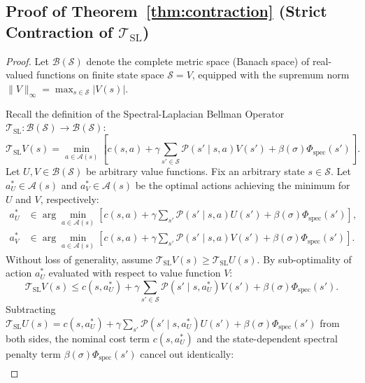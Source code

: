 \documentclass[11pt,a4paper]{article}
\begin{document}
\subsection{Proof of Theorem~\ref{thm:contraction} (Strict Contraction of $\mathcal{T}_{\text{SL}}$)}
\label{subsec:proof_thm2}

\begin{proof}
Let $\mathcal{B}(\mathcal{S})$ denote the complete metric space (Banach space) of real-valued functions on finite state space $\mathcal{S} = V$, equipped with the supremum norm $\|V\|_\infty = \max_{s \in \mathcal{S}} |V(s)|$.

Recall the definition of the Spectral-Laplacian Bellman Operator $\mathcal{T}_{\text{SL}}: \mathcal{B}(\mathcal{S}) \to \mathcal{B}(\mathcal{S})$:
\begin{equation}
\mathcal{T}_{\text{SL}} V(s) = \min_{a \in \mathcal{A}(s)} \left[ c(s, a) + \gamma \sum_{s' \in \mathcal{S}} \mathcal{P}(s' \mid s, a) V(s') + \beta(\sigma) \Phi_{\text{spec}}(s') \right].
\end{equation}
Let $U, V \in \mathcal{B}(\mathcal{S})$ be arbitrary value functions. Fix an arbitrary state $s \in \mathcal{S}$. Let $a_U^* \in \mathcal{A}(s)$ and $a_V^* \in \mathcal{A}(s)$ be the optimal actions achieving the minimum for $U$ and $V$, respectively:
\begin{align}
a_U^* &\in \arg\min_{a \in \mathcal{A}(s)} \left[ c(s, a) + \gamma \sum_{s'} \mathcal{P}(s' \mid s, a) U(s') + \beta(\sigma) \Phi_{\text{spec}}(s') \right], \\
a_V^* &\in \arg\min_{a \in \mathcal{A}(s)} \left[ c(s, a) + \gamma \sum_{s'} \mathcal{P}(s' \mid s, a) V(s') + \beta(\sigma) \Phi_{\text{spec}}(s') \right].
\end{align}
Without loss of generality, assume $\mathcal{T}_{\text{SL}} V(s) \ge \mathcal{T}_{\text{SL}} U(s)$. By sub-optimality of action $a_U^*$ evaluated with respect to value function $V$:
\begin{equation}
\mathcal{T}_{\text{SL}} V(s) \le c(s, a_U^*) + \gamma \sum_{s' \in \mathcal{S}} \mathcal{P}(s' \mid s, a_U^*) V(s') + \beta(\sigma) \Phi_{\text{spec}}(s').
\end{equation}
Subtracting $\mathcal{T}_{\text{SL}} U(s) = c(s, a_U^*) + \gamma \sum_{s'} \mathcal{P}(s' \mid s, a_U^*) U(s') + \beta(\sigma) \Phi_{\text{spec}}(s')$ from both sides, the nominal cost term $c(s, a_U^*)$ and the state-dependent spectral penalty term $\beta(\sigma) \Phi_{\text{spec}}(s')$ cancel out identically:
\begin{align}

\end{align}
\end{proof}
\end{document}
